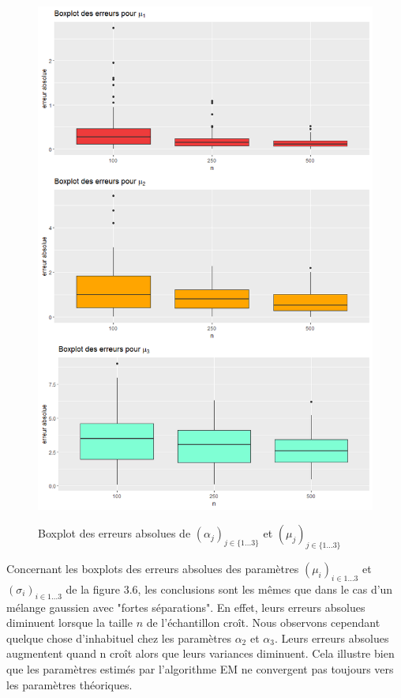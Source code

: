 \documentclass[frenchb]{report}
\newcommand{\1}{\mathbbm{1}}
\theoremstyle{definition}\newtheorem{defn}{Définition}
\theoremstyle{definition}\newtheorem{exm}{Exemple}
\theoremstyle{definition}\newtheorem{nota}{Notation}
\theoremstyle{definition}\newtheorem{rem}{Remarque}
\begin{document}
\begin{figure}[htp]
{		\includegraphics[scale=0.35]{images/bad_mu.png}%
		\label{fig:d}%
	}%
	\caption{Boxplot des erreurs absolues de $(\alpha_j)_{j \in  \{1\dots3\}}$ et $(\mu_j)_{j \in \{1\dots3\}}$}
\end{figure}

Concernant les boxplots des erreurs absolues des paramètres $(\mu_{i})_{i \in 1 \dots 3}$ et $(\sigma_i)_{i \in 1 \dots 3}$ de la figure 3.6, les conclusions sont les mêmes que dans le cas d'un mélange gaussien avec "fortes séparations". En effet, leurs erreurs absolues diminuent lorsque la taille $n$ de l'échantillon croît. Nous observons cependant quelque chose d'inhabituel chez les paramètres $\alpha_2$ et $\alpha_3$. Leurs erreurs absolues augmentent quand n croît alors que leurs variances diminuent. Cela illustre bien que les paramètres estimés par l'algorithme EM ne convergent pas toujours vers les paramètres théoriques.
\end{document}
